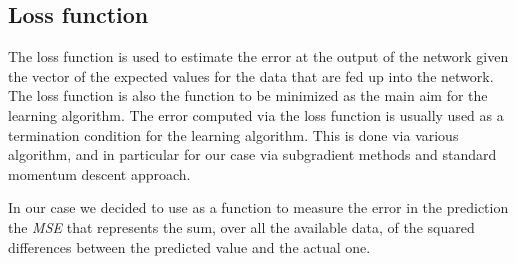 \subsection{Loss function}
The loss function is used to estimate the error at the output of the network given the vector of the expected values for the data that are fed up into the network. The loss function is also the function to be minimized as the main aim for the learning algorithm. The error computed via the loss function is usually used as a termination condition for the learning algorithm. This is done via various algorithm, and in particular for our case via subgradient methods and standard momentum descent approach.\newline

In our case we decided to use as a function to measure the error in the prediction the \textit{MSE} that represents the sum, over all the available data, of the squared differences between the predicted value and the actual one.\newline